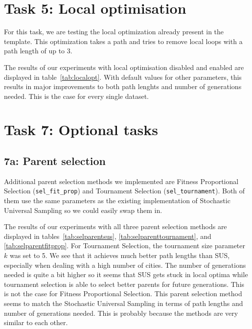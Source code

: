 \documentclass{report}
\begin{document}
\newpage
\section{Task 5: Local optimisation}
\label{sec:local}
For this task, we are testing the local optimization already present in the template. This optimization takes a path and tries to remove local loops with a path length of up to 3.

The results of our experiments with local optimisation disabled and enabled are displayed in table~\ref{tab:localopt}. With default values for other parameters, this results in major improvements to both path lenghts and number of generations needed. This is the case for every single dataset.



\section{Task 7: Optional tasks}
\subsection{7a: Parent selection}
Additional parent selection methods we implemented are Fitness Proportional Selection (\texttt{sel\_fit\_prop}) and Tournament Selection (\texttt{sel\_tournament}). Both of them use the same parameters as the existing implementation of Stochastic Universal Sampling so we could easily swap them in.

The results of our experiments with all three parent selection methods are displayed in tables~\ref{tab:selparentsus}, \ref{tab:selparenttournament}, and \ref{tab:selparentfitprop}. For Tournament Selection, the tournament size parameter $k$ was set to 5. We see that it achieves much better path lengths than SUS, especially when dealing with a high number of cities. The number of generations needed is quite a bit higher so it seems that SUS gets stuck in local optima while tournament selection is able to select better parents for future generations. This is not the case for Fitness Proportional Selection. This parent selection method seems to match the Stochastic Universal Sampling in terms of path lengths and number of generations needed. This is probably because the methods are very similar to each other.
\end{document}
